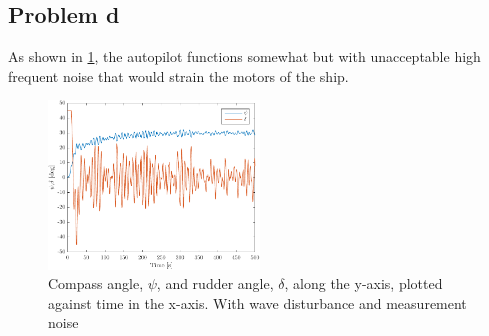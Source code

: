 \subsection{Problem d}
As shown in \cref{fig:3b-psi_and_rudder_w_waves}, the autopilot functions somewhat but with unacceptable high frequent noise that would strain the motors of the ship. 

\begin{figure}[ht]
    \centering
    \includegraphics[width=0.5\textwidth]{images/3d-psi_and_rudder_w_waves}
    \caption{Compass angle, $\psi$, and rudder angle, $\delta$, along the y-axis, plotted against time in the x-axis. With wave disturbance and measurement noise}
    \label{fig:3b-psi_and_rudder_w_waves}
\end{figure}